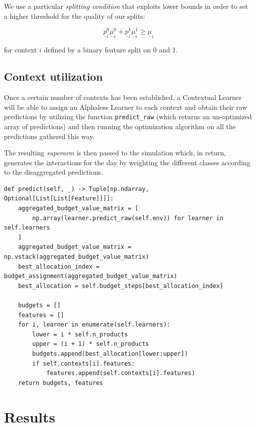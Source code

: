 We use a particular \textit{splitting condition} that exploits lower bounds in order to set a higher threshold for the quality of our splits:

\begin{Large}
	\begin{displaymath}
		\underline{p}_i^0 \underline{\mu}_i^0 + \underline{p}_i^1 \underline{\mu}_i^1 \geq \underline{\mu}_i
	\end{displaymath}
\end{Large}

for context $i$ defined by a binary feature split on 0 and 1.

\subsection{Context utilization}

Once a certain number of contexts has been established, a Contextual Learner will be able to assign an Alphaless Learner to each context and obtain their raw predictions by utilizing the function \texttt{predict\_raw} (which returns an un-optimized array of predictions) and then running the optimization algorithm on all the predictions gathered this way.

The resulting \textit{superarm} is then passed to the simulation which, in return, generates the interactions for the day by weighting the different classes according to the disaggregated predictions.

\begin{lstlisting}[style=Python]
def predict(self, _) -> Tuple[np.ndarray, Optional[List[List[Feature]]]]:
	aggregated_budget_value_matrix = [
		np.array(learner.predict_raw(self.env)) for learner in self.learners
	]
	aggregated_budget_value_matrix = np.vstack(aggregated_budget_value_matrix)
	best_allocation_index = budget_assignment(aggregated_budget_value_matrix)
	best_allocation = self.budget_steps[best_allocation_index]

	budgets = []
	features = []
	for i, learner in enumerate(self.learners):
		lower = i * self.n_products
		upper = (i + 1) * self.n_products
		budgets.append(best_allocation[lower:upper])
		if self.contexts[i].features:
			features.append(self.contexts[i].features)
	return budgets, features
\end{lstlisting}

\section{Results}
\label{sec:ctx_gen_res}

